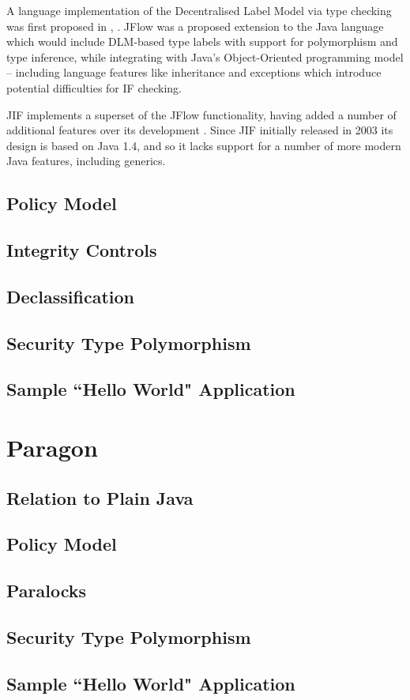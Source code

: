A language implementation of the Decentralised Label Model via type checking was first proposed in , \cite{myers1999jflow}. JFlow was a proposed extension to the Java language which would include DLM-based type labels with support for polymorphism and type inference, while integrating with Java's Object-Oriented programming model -- including language features like inheritance and exceptions which introduce potential difficulties for IF checking.

JIF implements a superset of the JFlow functionality, having added a number of additional features over its development \cite{jifwebsite}. Since JIF initially released in 2003 its design is based on Java 1.4, and so it lacks support for a number of more modern Java features, including generics.

\subsection{Policy Model}

\subsection{Integrity Controls}

\subsection{Declassification}

\subsection{Security Type Polymorphism}

\subsection{Sample ``Hello World" Application}

\section{Paragon}

\subsection{Relation to Plain Java}

\subsection{Policy Model}

\subsection{Paralocks}

\subsection{Security Type Polymorphism}

\subsection{Sample ``Hello World" Application}